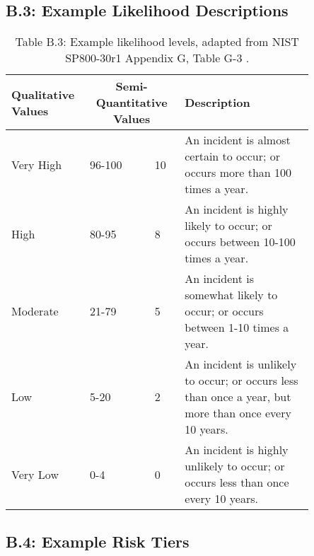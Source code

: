 \documentclass[fleqn]{article}
\begin{document}
\subsection*{B.3: Example Likelihood Descriptions}

\begin{table}[H]
	\caption*{Table B.3: Example likelihood levels, adapted from NIST SP800-30r1 Appendix G, Table G-3 \cite{nist80030r1}.}
    \begin{tabular}{|m{0.20\linewidth} |m{0.20\linewidth} | m{0.05\linewidth} | m{0.40\linewidth}|}
        \hline
        \textbf{Qualitative Values} & \multicolumn{2}{c|}{\textbf{Semi-Quantitative Values}} & \textbf{Description} \\
        \hline
        Very High & 96-100 & 10 & An incident is almost certain to occur; or occurs more than 100 times a year. \\
        \hline
        High & 80-95 & 8 & An incident is highly likely to occur; or occurs between 10-100 times a year.\\
        \hline		
        Moderate & 21-79 & 5 & An incident is somewhat likely to occur; or occurs between 1-10 times a year.\\
        \hline
        Low & 5-20 & 2 & An incident is unlikely to occur; or occurs less than once a year, but more than once every 10 years.  \\
        \hline
        Very Low & 0-4 & 0 & An incident is highly unlikely to occur; or occurs less than once every 10 years. \\
        \hline
    \end{tabular}
    \label{table:nist_likelihood}
\end{table}

\subsection*{B.4: Example Risk Tiers}
\end{document}

